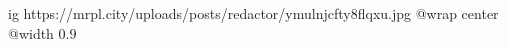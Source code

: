  
 
 
 
 

\ifcmt
  ig https://mrpl.city/uploads/posts/redactor/ymulnjcfty8flqxu.jpg
  @wrap center
  @width 0.9
\fi
